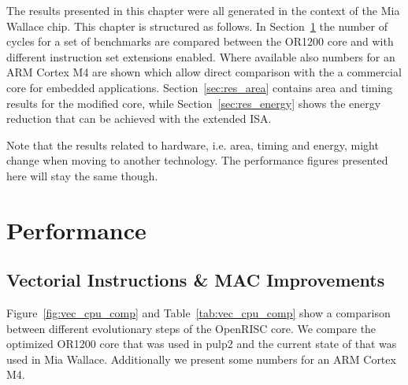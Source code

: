 The results presented in this chapter were all generated in the context of the
Mia Wallace chip.
This chapter is structured as follows. In Section~\ref{sec:res_performance} the
number of cycles for a set of benchmarks are compared between the OR1200 core
and \orion with different instruction set extensions enabled. Where available
also numbers for an ARM Cortex M4 are shown which allow direct comparison with
the a commercial core for embedded applications.
Section~\ref{sec:res_area} contains area and timing results for the modified
\orion core, while Section~\ref{sec:res_energy} shows the energy reduction that
can be achieved with the extended \gls{ISA}.

Note that the results related to hardware, i.e. area, timing and energy, might change
when moving to another technology. The performance figures presented here will
stay the same though.





\section{Performance}

\label{sec:res_performance}

\subsection{Vectorial Instructions \& MAC Improvements}

Figure~\ref{fig:vec_cpu_comp} and Table~\ref{tab:vec_cpu_comp} show a
comparison between different evolutionary steps of the \orion OpenRISC core.
We compare the optimized OR1200 core that was used in pulp2 and the current
state of \orion that was used in Mia Wallace. Additionally we present some
numbers for an ARM Cortex M4.

